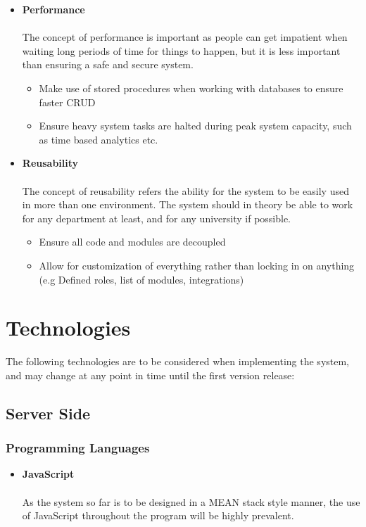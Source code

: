 \documentclass[12pt]{article}
\begin{document}
\begin{itemize}
	\item \textbf{Performance}\\\\
	The concept of performance is important as people can get impatient when waiting long periods of time for things to happen, but it is less important than ensuring a safe and secure system.
	\begin{itemize}
		\item Make use of stored procedures when working with databases to ensure faster CRUD
		\item Ensure heavy system tasks are halted during peak system capacity, such as time based analytics etc.
	\end{itemize}
	
	\item \textbf{Reusability}\\\\
	The concept of reusability refers the ability for the system to be easily used in more than one environment. The system should in theory be able to work for any department at least, and for any university if possible.
	\begin{itemize}
		\item Ensure all code and modules are decoupled
		\item Allow for customization of everything rather than locking in on anything (e.g Defined roles, list of modules, integrations)
	\end{itemize}
\end{itemize}

\pagebreak

\section{Technologies}

The following technologies are to be considered when implementing the system, and may change at any point in time until the first version release:

	\subsection{Server Side}
	
		\subsubsection{Programming Languages}

		\begin{itemize}
			\item \textbf{JavaScript}\\\\
			As the system so far is to be designed in a MEAN stack style manner, the use of JavaScript throughout the program will be highly prevalent.
		\end{itemize}
	
\end{document}
